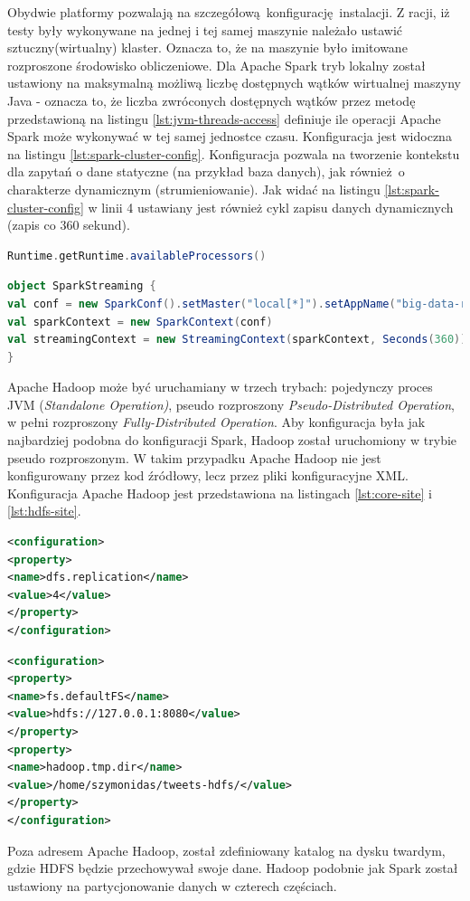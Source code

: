 Obydwie platformy pozwalają na szczegółową konfigurację instalacji. Z racji, iż testy były wykonywane na jednej i tej samej maszynie należało ustawić sztuczny(wirtualny) klaster. Oznacza to, że na maszynie było imitowane rozproszone środowisko obliczeniowe. Dla Apache Spark tryb lokalny został ustawiony na maksymalną możliwą liczbę dostępnych wątków wirtualnej maszyny Java - oznacza to, że liczba zwróconych dostępnych wątków przez metodę przedstawioną na listingu \ref{lst:jvm-threads-access} definiuje ile operacji Apache Spark może wykonywać w tej samej jednostce czasu. Konfiguracja jest widoczna na listingu \ref{lst:spark-cluster-config}. Konfiguracja pozwala na tworzenie kontekstu dla zapytań o dane statyczne (na przykład baza danych), jak również o charakterze dynamicznym (strumieniowanie). Jak widać na listingu \ref{lst:spark-cluster-config} w linii 4 ustawiany jest również cykl zapisu danych dynamicznych (zapis co 360 sekund).
\begin{lstlisting}[language=scala, caption={Metoda zwracająca liczbę dostępnych wątków wirtualnej maszyny Java},captionpos=b, label={lst:jvm-threads-access}]
Runtime.getRuntime.availableProcessors() 
\end{lstlisting}
\begin{lstlisting}[language=scala, caption={Konfigracja klastra dla Apache Spark},captionpos=b, label={lst:spark-cluster-config}]
object SparkStreaming {
val conf = new SparkConf().setMaster("local[*]").setAppName("big-data-runner-spark-driver-application")
val sparkContext = new SparkContext(conf)
val streamingContext = new StreamingContext(sparkContext, Seconds(360))
}
\end{lstlisting} 
Apache Hadoop może być uruchamiany w trzech trybach: pojedynczy proces JVM (\textit{Standalone Operation)}, pseudo rozproszony \textit{Pseudo-Distributed Operation}, w pełni rozproszony \textit{Fully-Distributed Operation}. Aby konfiguracja była jak najbardziej podobna do konfiguracji Spark, Hadoop został uruchomiony w trybie pseudo rozproszonym. W takim przypadku Apache Hadoop nie jest konfigurowany przez kod źródłowy, lecz przez pliki konfiguracyjne XML. Konfiguracja Apache Hadoop jest przedstawiona na listingach \ref{lst:core-site} i \ref{lst:hdfs-site}.
\begin{lstlisting}[language=XML, label={lst:hdfs-site},captionpos=b, caption={Konfigracja Apache Hadoop dla trybu pseudo rozproszonego. Plik hdfs-site.xml}]
<configuration>
<property>
<name>dfs.replication</name>
<value>4</value>
</property>
</configuration>
\end{lstlisting}
\begin{lstlisting}[language=XML, label={lst:core-site}, captionpos=b, caption={Konfigracja Apache Hadoop dla trybu pseudo rozproszonego. Plik core-site.xml}, float]
<configuration>
<property>
<name>fs.defaultFS</name>
<value>hdfs://127.0.0.1:8080</value>
</property>
<property>
<name>hadoop.tmp.dir</name>
<value>/home/szymonidas/tweets-hdfs/</value>
</property>
</configuration>
\end{lstlisting}
Poza adresem Apache Hadoop, został zdefiniowany katalog na dysku twardym, gdzie HDFS będzie przechowywał swoje dane. Hadoop podobnie jak Spark został ustawiony na partycjonowanie danych w czterech częściach.
